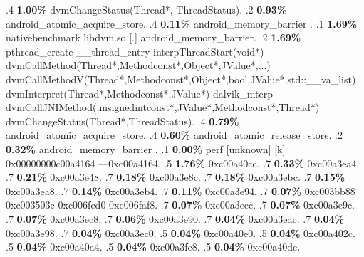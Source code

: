 \begin{profile}
{.4 \textbf{1.00\%} dvmChangeStatus(Thread*, ThreadStatus). 
.2 \textbf{0.93\%} android\_atomic\_acquire\_store. 
.4 \textbf{0.11\%} android\_memory\_barrier\newline {} . 
.1 \textbf{ 1.69\%} nativebenchmark  libdvm.so              [.] android\_memory\_barrier. 
.2 \textbf{1.69\%} pthread\_create\newline {} \_\_thread\_entry\newline {} interpThreadStart(void*)\newline {} dvmCallMethod(Thread*,Methodconst*,Object*,JValue*,...)\newline {} dvmCallMethodV(Thread*,Methodconst*,Object*,bool,JValue*,std::\_\_va\_list)\newline {} dvmInterpret(Thread*,Methodconst*,JValue*)\newline {} dalvik\_mterp\newline {} dvmCallJNIMethod(unsignedintconst*,JValue*,Methodconst*,Thread*)\newline {} dvmChangeStatus(Thread*,ThreadStatus). 
.4 \textbf{0.79\%} android\_atomic\_acquire\_store. 
.4 \textbf{0.60\%} android\_atomic\_release\_store. 
.2 \textbf{0.32\%} android\_memory\_barrier\newline {} . 
.1 \textbf{ 0.00\%} perf             [unknown]              [k] 0x00000000c00a4164\newline {} ---0xc00a4164. 
.5 \textbf{1.76\%} 0xc00a40cc. 
.7 \textbf{0.33\%} 0xc00a3ea4. 
.7 \textbf{0.21\%} 0xc00a3e48. 
.7 \textbf{0.18\%} 0xc00a3e8c. 
.7 \textbf{0.18\%} 0xc00a3ebc. 
.7 \textbf{0.15\%} 0xc00a3ea8. 
.7 \textbf{0.14\%} 0xc00a3eb4. 
.7 \textbf{0.11\%} 0xc00a3e94. 
.7 \textbf{0.07\%} 0xc003bb88\newline {} 0xc003503c\newline {} 0xc006fed0\newline {} 0xc006faf8. 
.7 \textbf{0.07\%} 0xc00a3ecc. 
.7 \textbf{0.07\%} 0xc00a3e9c. 
.7 \textbf{0.07\%} 0xc00a3ec8. 
.7 \textbf{0.06\%} 0xc00a3e90. 
.7 \textbf{0.04\%} 0xc00a3eac. 
.7 \textbf{0.04\%} 0xc00a3e98. 
.7 \textbf{0.04\%} 0xc00a3ec0. 
.5 \textbf{0.04\%} 0xc00a40e0. 
.5 \textbf{0.04\%} 0xc00a402c. 
.5 \textbf{0.04\%} 0xc00a40a4. 
.5 \textbf{0.04\%} 0xc00a3fc8. 
.5 \textbf{0.04\%} 0xc00a40dc. 
}
\end{profile}
